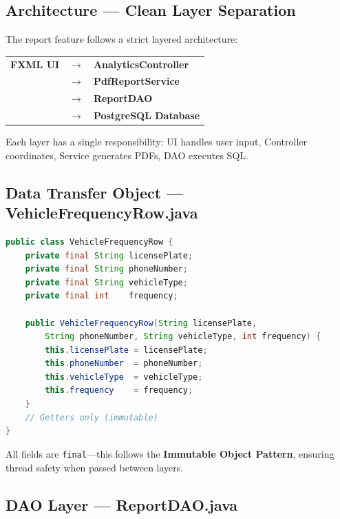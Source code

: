 \documentclass[12pt,a4paper]{article}
\begin{document}
\subsection{Architecture — Clean Layer Separation}
The report feature follows a strict layered architecture:

\begin{center}
\begin{tabular}{rcl}
\textbf{FXML UI} & $\rightarrow$ & \textbf{AnalyticsController} \\
& $\rightarrow$ & \textbf{PdfReportService} \\
& $\rightarrow$ & \textbf{ReportDAO} \\
& $\rightarrow$ & \textbf{PostgreSQL Database} \\
\end{tabular}
\end{center}

Each layer has a single responsibility: UI handles user input, Controller coordinates, Service generates PDFs, DAO executes SQL.

\subsection{Data Transfer Object — VehicleFrequencyRow.java}

\begin{lstlisting}[language=Java, caption={VehicleFrequencyRow DTO}]
public class VehicleFrequencyRow {
    private final String licensePlate;
    private final String phoneNumber;
    private final String vehicleType;
    private final int    frequency;

    public VehicleFrequencyRow(String licensePlate, 
        String phoneNumber, String vehicleType, int frequency) {
        this.licensePlate = licensePlate;
        this.phoneNumber  = phoneNumber;
        this.vehicleType  = vehicleType;
        this.frequency    = frequency;
    }
    // Getters only (immutable)
}
\end{lstlisting}

All fields are \texttt{final}---this follows the \textbf{Immutable Object Pattern}, ensuring thread safety when passed between layers.

\subsection{DAO Layer — ReportDAO.java}
\end{document}
